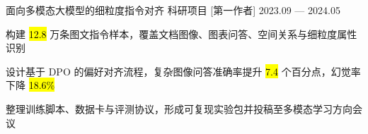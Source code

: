 
\Needspace{62mm}

\Project
  {面向多模态大模型的细粒度指令对齐}
  {科研项目}
  [第一作者]
  {2023.09 — 2024.05}
\begin{Bullets}
  \item 构建 \hl{12.8} 万条图文指令样本，覆盖文档图像、图表问答、空间关系与细粒度属性识别
  \item 设计基于 DPO 的偏好对齐流程，复杂图像问答准确率提升 \hl{7.4} 个百分点，幻觉率下降 \hl{18.6\%}
  \item 整理训练脚本、数据卡与评测协议，形成可复现实验包并投稿至多模态学习方向会议
\end{Bullets}
